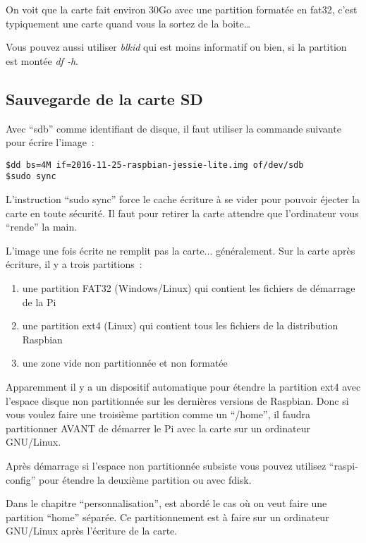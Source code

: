 On voit que la carte fait environ 30Go avec une partition formatée en fat32, c'est typiquement une carte quand vous la sortez de la boite\dots 

Vous pouvez aussi utiliser \emph{blkid} qui est moins informatif ou bien, si la partition est montée \emph{df -h}.

\subsection{Sauvegarde de la carte SD}

Avec ``sdb'' comme identifiant de disque, il faut utiliser la commande suivante pour écrire l'image~:
\begin{verbatim}
$dd bs=4M if=2016-11-25-raspbian-jessie-lite.img of/dev/sdb
$sudo sync
\end{verbatim}

L'instruction ``sudo sync'' force le cache écriture à se vider pour pouvoir éjecter la carte en toute sécurité. Il faut pour retirer la carte attendre que l'ordinateur vous ``rende'' la main.

L'image une fois écrite ne remplit pas la carte... généralement. Sur la carte après écriture, il y a trois partitions~:
\begin{enumerate}
 \item une partition FAT32 (Windows/Linux) qui contient les fichiers de démarrage de la Pi
 \item une partition ext4 (Linux) qui contient tous les fichiers de la distribution Raspbian
 \item une zone vide non partitionnée et  non formatée
 \end{enumerate}
 
 Apparemment il y a un dispositif automatique pour étendre la partition ext4 avec l'espace disque non partitionnée sur les dernières versions de Raspbian. Donc si vous voulez faire une troisième partition comme un ``/home'', il faudra partitionner AVANT de démarrer le Pi avec la carte sur un ordinateur GNU/Linux. 
 
Après démarrage si l'espace non partitionnée subsiste vous pouvez utilisez ``raspi-config'' pour étendre la deuxième partition ou avec fdisk.
 
Dans le chapitre ``personnalisation'', est abordé le cas où on veut faire une partition ``home'' séparée. Ce partitionnement est à faire sur un ordinateur GNU/Linux après l'écriture de la carte.